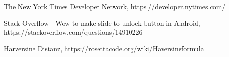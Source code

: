 \documentclass[11pt,a4paper]{article}
\begin{document}
\begin{thebibliography}{99}

 The New York Times Developer Network, https://developer.nytimes.com/

 Stack Overflow - Wow to make slide to unlock button in Android, https://stackoverflow.com/questions/14910226

 Harversine Distanz, 
https://rosettacode.org/wiki/Haversine\textunderscore formula


\end{thebibliography}
\end{document}
